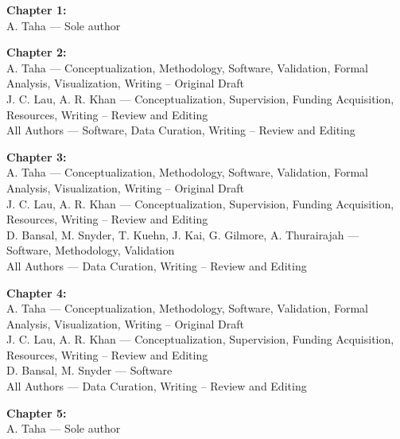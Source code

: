 
\noindent \textbf{Chapter 1:}\\
\hangindent=1.2cm A. Taha — Sole author

\vspace{0.5em}

\noindent \textbf{Chapter 2:}\\
\hangindent=1.2cm A. Taha — Conceptualization, Methodology, Software, Validation, Formal Analysis, Visualization, Writing – Original Draft \\
\hangindent=1.2cm J. C. Lau, A. R. Khan — Conceptualization, Supervision, Funding Acquisition, Resources, Writing – Review and Editing \\
\hangindent=1.2cm All Authors — Software, Data Curation, Writing – Review and Editing

\vspace{0.5em}

\noindent \textbf{Chapter 3:}\\
\hangindent=1.2cm A. Taha — Conceptualization, Methodology, Software, Validation, Formal Analysis, Visualization, Writing – Original Draft \\
\hangindent=1.2cm J. C. Lau, A. R. Khan — Conceptualization, Supervision, Funding Acquisition, Resources, Writing – Review and Editing \\
\hangindent=1.2cm D. Bansal, M. Snyder, T. Kuehn, J. Kai, G. Gilmore, A. Thurairajah — Software, Methodology, Validation \\
\hangindent=1.2cm All Authors — Data Curation, Writing – Review and Editing

\vspace{0.5em}

\noindent \textbf{Chapter 4:}\\
\hangindent=1.2cm A. Taha — Conceptualization, Methodology, Software, Validation, Formal Analysis, Visualization, Writing – Original Draft \\
\hangindent=1.2cm J. C. Lau, A. R. Khan — Conceptualization, Supervision, Funding Acquisition, Resources, Writing – Review and Editing \\
\hangindent=1.2cm D. Bansal, M. Snyder — Software \\
\hangindent=1.2cm All Authors — Data Curation, Writing – Review and Editing

\vspace{0.5em}

\noindent \textbf{Chapter 5:}\\
\hangindent=1.2cm A. Taha — Sole author
